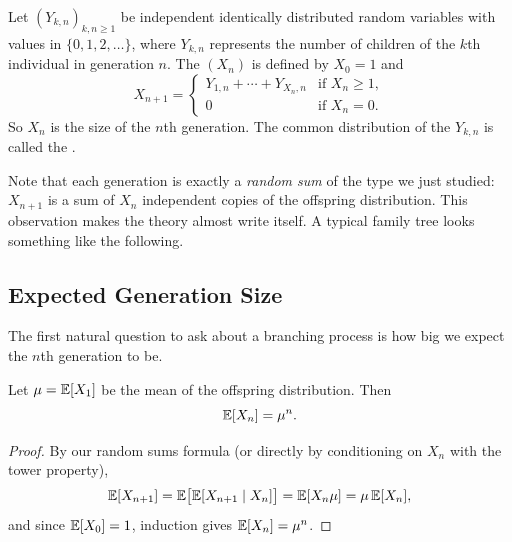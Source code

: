 \documentclass[a4paper]{scrartcl}
\begin{document}
\begin{definition}
	Let $(Y_{k, n})_{k, n \geq 1}$ be independent identically distributed random variables with values in $\{0, 1, 2, \dots\}$, where $Y_{k, n}$ represents the number of children of the $k$th individual in generation $n$. The  $(X_n)$ is defined by $X_0 = 1$ and
	$$
	X_{n + 1} = \begin{cases}
		Y_{1, n} + \cdots + Y_{X_n, n} & \text{if } X_n \geq 1, \\
		0 & \text{if } X_n = 0.
	\end{cases}
	$$
	So $X_n$ is the size of the $n$th generation. The common distribution of the $Y_{k,n}$ is called the .
\end{definition}

Note that each generation is exactly a \emph{random sum} of the type we just studied: $X_{n+1}$ is a sum of $X_n$ independent copies of the offspring distribution. This observation makes the theory almost write itself. A typical family tree looks something like the following.

\begin{center}
\end{center}

\subsection{Expected Generation Size}

The first natural question to ask about a branching process is how big we expect the $n$th generation to be.

\begin{theorem}
	Let $\mu = \mathbb{E}[X_1]$ be the mean of the offspring distribution. Then
	$$
	\mathbb{E}[X_n] = \mu^n.
	$$
\end{theorem}
\begin{proof}
	By our random sums formula (or directly by conditioning on $X_n$ with the tower property),
	$$
	\mathbb{E}[X_{n + 1}] = \mathbb{E}\big[\mathbb{E}[X_{n+1} \mid X_n]\big] = \mathbb{E}[X_n \mu] = \mu\, \mathbb{E}[X_n],
	$$
	and since $\mathbb{E}[X_0] = 1$, induction gives $\mathbb{E}[X_n] = \mu^n$.
\end{proof}
\end{document}
